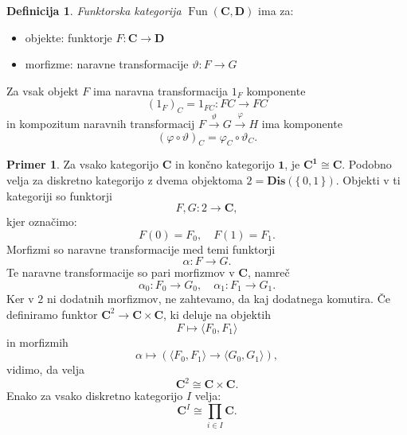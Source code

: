 \documentclass[12pt,a4paper]{book}
\theoremstyle{definition}
\newtheorem{definicija}{Definicija}[chapter]
\theoremstyle{plain}
\theoremstyle{definition}
\newtheorem{primer}{Primer}[section]
\theoremstyle{remark}
\newcommand{\cat}[1]{\textbf{#1}}
\DeclareMathOperator{\Fun}{Fun}
\renewcommand{\set}[1]{\{\,#1\,\}}
\newcommand{\fprod}[1]{\langle #1 \rangle}
\begin{document}
\begin{definicija}
\emph{Funktorska kategorija} $\Fun(\cat{C}, \cat{D})$ ima za:
\begin{itemize}
\item objekte: funktorje $F : \cat{C} \to \cat{D}$
\item morfizme: naravne transformacije $\vartheta : F \to G$
\end{itemize}
Za vsak objekt $F$ ima naravna transformacija $1_F$ komponente
$$ (1_F)_C = 1_{FC} : FC \to FC$$
in kompozitum naravnih transformacij $F \xrightarrow{\vartheta} G \xrightarrow{\varphi} H$
ima komponente
$$ (\varphi \circ \vartheta)_C = \varphi_C \circ \vartheta_C.$$
\end{definicija}

\begin{primer}
Za vsako kategorijo $\cat{C}$ in končno kategorijo $\cat{1}$, je $\cat{C}^\cat{1} \cong \cat{C}$. Podobno velja za diskretno kategorijo z dvema objektoma $2 = \cat{Dis}(\set{0,1})$.
Objekti v ti kategoriji so funktorji
$$F,G : 2 \to \cat{C},$$
kjer označimo:
$$F(0) = F_0, \quad F(1) = F_1.$$
Morfizmi so naravne transformacije med temi funktorji
$$\alpha: F \to G.$$
Te naravne transformacije so pari morfizmov v $\cat{C}$, namreč
$$\alpha_0 : F_0 \to G_0, \quad \alpha_1 : F_1 \to G_1.$$
Ker v $2$ ni dodatnih morfizmov, ne zahtevamo, da kaj dodatnega komutira.
Če definiramo funktor $\cat{C}^2 \to \cat{C} \times \cat{C}$, ki deluje na objektih
$$F \mapsto \fprod{F_0,F_1}$$
in morfizmih
$$\alpha \mapsto (\fprod{F_0,F_1} \to \fprod{G_0,G_1}),$$
vidimo, da velja
$$\cat{C}^2 \cong \cat{C} \times \cat{C}.$$
Enako za vsako diskretno kategorijo $I$ velja:
$$\cat{C}^I \cong \prod_{i \in I}\cat{C}.$$

\end{primer}
\end{document}
